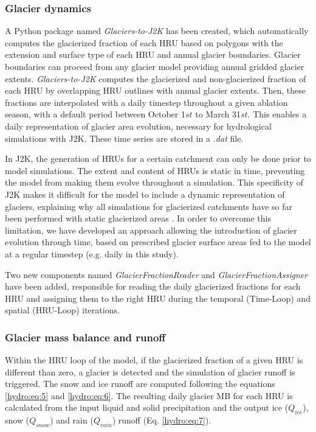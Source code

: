 \subsubsection{Glacier dynamics}

A Python package named \textit{Glaciers-to-J2K} has been created, which automatically computes the glacierized fraction of each HRU based on polygons with the extension and surface type of each HRU and annual glacier boundaries. Glacier boundaries can proceed from any glacier model providing annual gridded glacier extents. \textit{Glaciers-to-J2K} computes the glacierized and non-glacierized fraction of each HRU by overlapping HRU outlines with annual glacier extents. Then, these fractions are interpolated with a daily timestep throughout a given ablation season, with a default period between October 1${st}$ to March 31${st}$. This enables a daily representation of glacier area evolution, necessary for hydrological simulations with J2K. These time series are stored in a \textit{.dat} file.

In J2K, the generation of HRUs for a certain catchment can only be done prior to model simulations. The extent and content of HRUs is static in time, preventing the model from making them evolve throughout a simulation. This specificity of J2K makes it difficult for the model to include a dynamic representation of glaciers, explaining why all simulations for glacierized catchments have so far been performed with static glacierized areas \citep{gao_test_2012, nepal_understanding_2014}. In order to overcome this limitation, we have developed an approach allowing the introduction of glacier evolution through time, based on prescribed glacier surface areas fed to the model at a regular timestep (e.g. daily in this study). 

Two new components named \textit{GlacierFractionReader} and \textit{GlacierFractionAssigner} have been added, responsible for reading the daily glacierized fractions for each HRU and assigning them to the right HRU during the temporal (Time-Loop) and spatial (HRU-Loop) iterations. 

\subsubsection{Glacier mass balance and runoff}

Within the HRU loop of the model, if the glacierized fraction of a given HRU is different than zero, a glacier is detected and the simulation of glacier runoff is triggered. The snow and ice runoff are computed following the equations \ref{hydro:eq:5} and \ref{hydro:eq:6}. The resulting daily glacier MB for each HRU is calculated from the input liquid and solid precipitation and the output ice ($Q_{ice}$), snow ($Q_{snow}$) and rain ($Q_{rain}$) runoff (Eq. \ref{hydro:eq:7}).

